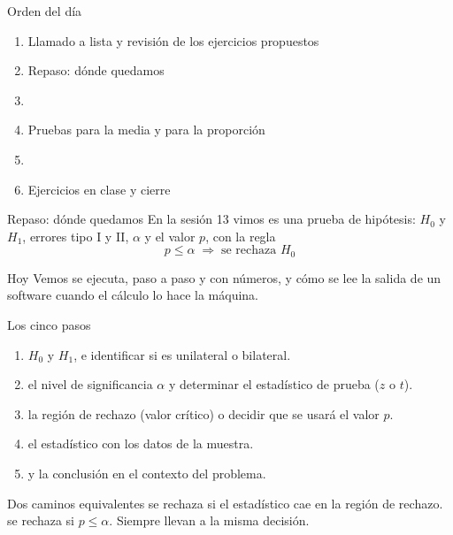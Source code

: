 \documentclass[aspectratio=169,10pt]{beamer}
\begin{document}
\portada

\begin{frame}{Orden del día}
  \begin{enumerate}
    \item Llamado a lista y revisión de los ejercicios propuestos
    \item Repaso: dónde quedamos
    \item {}
    \item Pruebas para la media y para la proporción
    \item {}
    \item Ejercicios en clase y cierre
  \end{enumerate}
\end{frame}

\begin{frame}{Repaso: dónde quedamos}
  En la sesión 13 vimos  es una prueba de hipótesis: $H_0$ y $H_1$,
  errores tipo I y II, $\alpha$ y el valor $p$, con la regla
  \[ p\le\alpha \;\Rightarrow\; \text{se rechaza } H_0 \]

  \vspace{0.2cm}
  \begin{alertblock}{Hoy}
    \footnotesize
    Vemos  se ejecuta, paso a paso y con números, y cómo se lee
    la salida de un software cuando el cálculo lo hace la máquina.
  \end{alertblock}
\end{frame}


\begin{frame}{Los cinco pasos}
  \small
  \begin{enumerate}
    \item {} $H_0$ y $H_1$, e identificar si es unilateral o
          bilateral.
    \item {} el nivel de significancia $\alpha$ y determinar el
          estadístico de prueba ($z$ o $t$).
    \item {} la región de rechazo (valor crítico) o decidir que se
          usará el valor $p$.
    \item {} el estadístico con los datos de la muestra.
    \item {} y  la conclusión en el contexto del
          problema.
  \end{enumerate}

  \vspace{0.25cm}
  \begin{alertblock}{Dos caminos equivalentes}
    \footnotesize
     se rechaza si el estadístico cae en la región de
    rechazo. \quad
     se rechaza si $p\le\alpha$. Siempre llevan a la misma
    decisión.
  \end{alertblock}
\end{frame}
\end{document}
